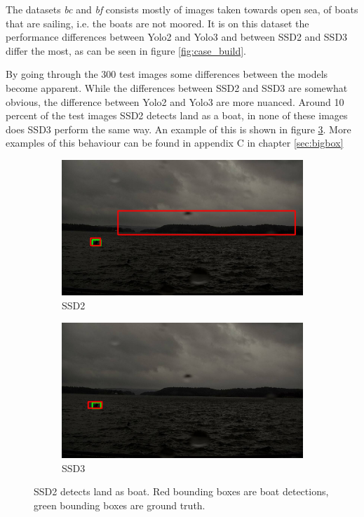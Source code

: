 The datasets \textit{bc} and \textit{bf} consists mostly of images taken towards open sea, of boats that are sailing, i.e. the boats are not moored. It is on this dataset the performance differences between Yolo2 and Yolo3 and between SSD2 and SSD3 differ the most, as can be seen in figure \ref{fig:case_build}.

\vspace{3mm}

By going through the 300 test images some differences between the models become apparent. While the differences between SSD2 and SSD3 are somewhat obvious, the difference between Yolo2 and Yolo3 are more nuanced. Around 10 percent of the test images SSD2 detects land as a boat, in none of these images does SSD3 perform the same way. An example of this is shown in figure \ref{img:bixbox_ssd}. More examples of this behaviour can be found in appendix C in chapter \ref{sec:bigbox}

\begin{figure}[h!]
\begin{subfigure}{.5\textwidth}
  \centering
  \includegraphics[width=0.9\linewidth]{results/case_buildings/bigbox_bcbf/SSD2/selected_06_14_axis0049.jpg}
  \caption{SSD2}
  \label{fig:big_box_ssd2}
\end{subfigure}%
\begin{subfigure}{.5\textwidth}
  \centering
  \includegraphics[width=.9\linewidth]{results/case_buildings/bigbox_bcbf/SSD3/selected_06_14_axis0049.jpg}
  \caption{SSD3}
  \label{fig:big_box_ssd3}
\end{subfigure}
\caption{SSD2 detects land as boat. Red bounding boxes are boat detections, green bounding boxes are ground truth.}
\label{img:bixbox_ssd}
\end{figure}

